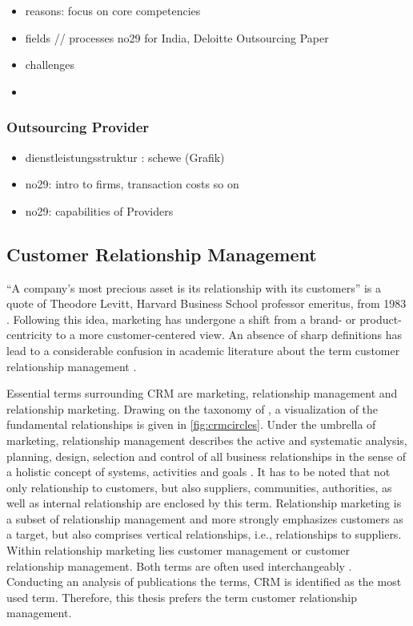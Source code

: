 		
		\begin{itemize}
			\item reasons: focus on core competencies
			\item fields // processes no29 for India, Deloitte Outsourcing Paper
			\item challenges
			\item 
		\end{itemize}
		\subsubsection{Outsourcing Provider}
		
		\begin{itemize}
			\item dienstleistungsstruktur  : schewe (Grafik)
			\item no29: intro to firms, transaction costs so on
			\item no29: capabilities of Providers
		\end{itemize}
		\subsection{Customer Relationship Management}
		\enquote{A company's most precious asset is its relationship with its customers} is a quote of Theodore Levitt, Harvard Business School professor emeritus, from 1983 \cite{levitt1983}. Following this idea, marketing has undergone a shift from a brand- or product-centricity to a more customer-centered view. An absence of sharp definitions has lead to a considerable confusion in academic literature about the term customer relationship management  \cite{paynefrow2005}. 
		
		Essential terms surrounding CRM are marketing, relationship management and relationship marketing. Drawing on the taxonomy of \cite{hippnerwilde2011}, a visualization of the fundamental relationships is given in \Fig \ref{fig:crmcircles}. Under the umbrella of marketing, relationship management describes the active and systematic analysis, planning, design, selection and control of all business relationships in the sense of a holistic concept of systems, activities and goals \citep[]{diller1995}. It has to be noted that not only relationship to customers, but also suppliers, communities, authorities, as well as internal relationship are enclosed by this term. Relationship marketing is a subset of relationship management and more strongly emphasizes customers as a target, but also comprises vertical relationships, i.e., relationships to suppliers. Within relationship marketing lies customer management or customer relationship management. Both terms are often used interchangeably  \cite{Leuer2011,ryals2001customer}. Conducting an analysis of publications \wrt the terms, \acrshort{CRM} is identified as the most used term. Therefore, this thesis prefers the term customer relationship management.
		
